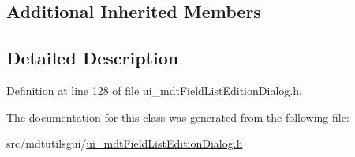 \subsection*{Additional Inherited Members}


\subsection{Detailed Description}


Definition at line 128 of file ui\-\_\-mdt\-Field\-List\-Edition\-Dialog.\-h.



The documentation for this class was generated from the following file\-:\begin{DoxyCompactItemize}
\item 
src/mdtutilsgui/\hyperlink{ui__mdt_field_list_edition_dialog_8h}{ui\-\_\-mdt\-Field\-List\-Edition\-Dialog.\-h}\end{DoxyCompactItemize}
